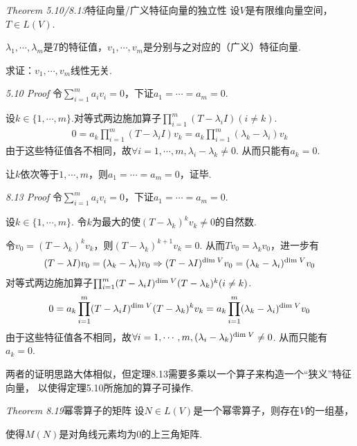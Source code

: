 \textit{Theorem 5.10/8.13}{\kaishu 特征向量/广义特征向量的独立性}
设\(V\)是有限维向量空间，\(T \in L(V)\).

\(\lambda_1,\cdots,\lambda_m\)是\(T\)的特征值，\(v_1,\cdots,v_m\)是分别与之对应的（广义）特征向量.

求证：\(v_1,\cdots,v_m\)线性无关.

\textit{5.10 Proof}
令\(\sum_{i=1}^m a_iv_i=0\)，下证\(a_1=\cdots=a_m=0\).

设\(k \in \{1,\cdots,m\}\).对等式两边施加算子\(\prod_{i=1}^m (T-\lambda_i I)(i \ne k)\).
    \begin{align*}
        0=a_{k}\prod_{i=1}^m (T-\lambda_i I) v_{k}=
        a_{k}\prod_{i=1}^m (\lambda_{k}-\lambda_i) v_{k}
    \end{align*}
由于这些特征值各不相同，故\(\forall i=1,\cdots,m,\lambda_i-\lambda_{k} \ne 0\).
从而只能有\(a_{k}=0\).

让\(k\)依次等于\(1,\cdots,m\)，则\(a_1=\cdots=a_m=0\)，证毕.

\textit{8.13 Proof}
令\(\sum_{i=1}^m a_iv_i=0\)，下证\(a_1=\cdots=a_m=0\).

设\(k \in \{1,\cdots,m\}\).
令\(k\)为最大的使\((T-\lambda_{k})^k v_{k} \ne 0\)的自然数.

令\(v_0=(T-\lambda_{k})^k v_{k}\)，则\((T-\lambda_{k})^{k+1} v_{k}=0\).
从而\(Tv_0=\lambda_{k}v_0\)，进一步有
    \begin{align*}
        (T-\lambda I)v_0=(\lambda_{k}-\lambda_i)v_0 \Rightarrow 
        (T-\lambda I)^{\mathrm{dim \;} V} v_0=(\lambda_{k}-\lambda_i)^{\mathrm{dim \;} V}v_0
    \end{align*}
对等式两边施加算子\(\prod_{i=1}^m (T-\lambda_i I)^{\mathrm{dim \;} V}(T-\lambda_{k})^k(i \ne k)\).
    \begin{align*}
        0=a_{k}\prod_{i=1}^m (T-\lambda_i I)^{\mathrm{dim \;} V}(T-\lambda_{k})^k v_{k}
        =a_{k}\prod_{i=1}^m (\lambda_{k}-\lambda_i)^{\mathrm{dim \;} V} v_0
    \end{align*}
由于这些特征值各不相同，故\(\forall i=1,\cdots,m,(\lambda_i-\lambda_{k})^{\mathrm{dim \;} V} \ne 0\).
从而只能有\(a_{k}=0\).

两者的证明思路大体相似，但定理8.13需要多乘以一个算子来构造一个“狭义”特征向量，
以使得定理5.10所施加的算子可操作.

\hspace*{\fill}

\textit{Theorem 8.19}{\kaishu 幂零算子的矩阵}
设\(N \in L(V)\)是一个幂零算子，则存在\(V\)的一组基，

使得\(M(N)\)是对角线元素均为\(0\)的上三角矩阵.

